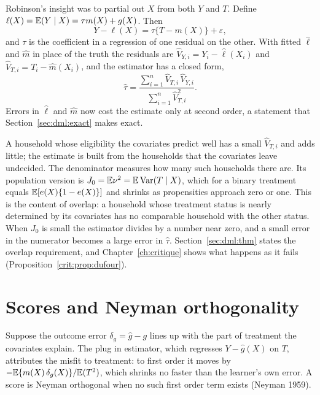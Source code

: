 Robinson's insight was to partial out $X$ from both $Y$ and $T$. Define $\ell(X) = \mathbb{E}(Y \mid X) = \tau m(X) + g(X)$. Then
\[
Y - \ell(X) = \tau \{T - m(X)\} + \varepsilon,
\]
and $\tau$ is the coefficient in a regression of one residual on the other. With fitted $\hat\ell$ and $\hat m$ in place of the truth the residuals are $\hat V_{Y,i} = Y_i - \hat\ell(X_i)$ and $\hat V_{T,i} = T_i - \hat m(X_i)$, and the estimator has a closed form,
\begin{equation}
\hat\tau = \frac{\sum_{i=1}^n \hat V_{T,i}\,\hat V_{Y,i}}{\sum_{i=1}^n \hat V_{T,i}^2}.
\label{eq:dml:ratio}
\end{equation}
Errors in $\hat\ell$ and $\hat m$ now cost the estimate only at second order, a statement that Section~\ref{sec:dml:exact} makes exact.

 A household whose eligibility the covariates predict well has a small $\hat V_{T,i}$ and adds little; the estimate is built from the households that the covariates leave undecided. The denominator measures how many such households there are. Its population version is $J_0 = \mathbb{E}\nu^2 = \mathbb{E}\,\mathrm{Var}(T \mid X)$, which for a binary treatment equals $\mathbb{E}[e(X)\{1 - e(X)\}]$ and shrinks as propensities approach zero or one. This is the content of overlap: a household whose treatment status is nearly determined by its covariates has no comparable household with the other status. When $J_0$ is small the estimator divides by a number near zero, and a small error in the numerator becomes a large error in $\hat\tau$. Section~\ref{sec:dml:thm} states the overlap requirement, and Chapter~\ref{ch:critique} shows what happens as it fails (Proposition~\ref{crit:prop:dufour}).

\section{Scores and Neyman orthogonality}\label{sec:dml:score}

Suppose the outcome error $\delta_g = \hat g - g$ lines up with the part of treatment the covariates explain. The plug in estimator, which regresses $Y - \hat g(X)$ on $T$, attributes the misfit to treatment: to first order it moves by $-\mathbb{E}\{m(X)\,\delta_g(X)\}/\mathbb{E}(T^2)$, which shrinks no faster than the learner's own error. A score is Neyman orthogonal when no such first order term exists (Neyman 1959).

